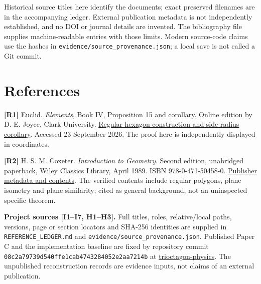 \documentclass[
  11pt,
  a4paper,
]{article}
\begin{document}
Historical source titles here identify the documents; exact preserved filenames are in the accompanying ledger. External publication metadata is not independently established, and no DOI or journal details are invented. The bibliography file supplies machine-readable entries with those limits. Modern source-code claims use the hashes in \texttt{evidence/source\_provenance.json}; a local save is not called a Git commit.

\section{References}\label{references}

\textbf{{[}R1{]}} Euclid. \emph{Elements}, Book IV, Proposition 15 and corollary. Online edition by D. E. Joyce, Clark University. \href{https://mathcs.clarku.edu/~djoyce/elements/bookIV/propIV15.html}{Regular hexagon construction and side-radius corollary}. Accessed 23 September 2026. The proof here is independently displayed in coordinates.

\textbf{{[}R2{]}} H. S. M. Coxeter. \emph{Introduction to Geometry}. Second edition, unabridged paperback, Wiley Classics Library, April 1989. ISBN 978-0-471-50458-0. \href{https://www.wiley-vch.de/en/areas-interest/mathematics-statistics/introduction-to-geometry-978-0-471-50458-0}{Publisher metadata and contents}. The verified contents include regular polygons, plane isometry and plane similarity; cited as general background, not an uninspected specific theorem.

\textbf{Project sources {[}I1--I7, H1--H3{]}.} Full titles, roles, relative/local paths, versions, page or section locators and SHA-256 identities are supplied in \texttt{REFERENCE\_LEDGER.md} and \texttt{evidence/source\_provenance.json}. Published Paper C and the implementation baseline are fixed by repository commit \texttt{08c2a79739d540ffe1cab4743284052e2aa7214b} at \href{https://github.com/pzychozen/trioctagon-physics/tree/08c2a79739d540ffe1cab4743284052e2aa7214b}{trioctagon-physics}. The unpublished reconstruction records are evidence inputs, not claims of an external publication.
\end{document}
